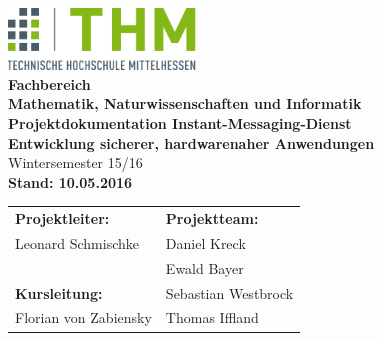\documentclass[12pt,a4paper,bibliography=totocnumbered,listof=totocnumbered]{scrartcl}
\begin{document}

\renewcommand{\sectionmark}[1]{\markright{#1}}
\renewcommand{\leftmark}{\rightmark}
\pagestyle{fancy}
\lhead{}
\chead{}
\rhead{\thesection\space\contentsname}
\cfoot{}
\renewcommand{\headrulewidth}{0.4pt}
\renewcommand{\footrulewidth}{0.4pt}

\renewcommand{\thesection}{\Roman{section}}
\renewcommand{\theHsection}{\Roman{section}}


\thispagestyle{empty}
\begin{center}
	\includegraphics[width=5cm]{img/thm2.png}\\
	\vspace*{2cm}
	\Large
	\textbf{Fachbereich}\\
	\textbf{Mathematik, Naturwissenschaften und Informatik }\\
	\vspace*{2cm}
	\Huge
	\textbf{Projektdokumentation Instant-Messaging-Dienst}\\
	\vspace*{1cm}
	\large
	\textbf{Entwicklung sicherer, hardwarenaher Anwendungen}\\
	\normalsize
	\vspace*{0.5cm}
	Wintersemester 15/16\\
	\vspace*{2cm}
	\textbf{Stand: 10.05.2016}
	
	\normalsize
	\vfill
	\begin{tabular}{ l l }
		\textbf{Projektleiter:}  & \textbf{Projektteam:}\\
		Leonard Schmischke & Daniel Kreck\\
		&  Ewald Bayer\\
		\textbf{Kursleitung:} & Sebastian Westbrock\\
		Florian von Zabiensky & Thomas Iffland\\
	\end{tabular}	
\end{center}
\end{document}
